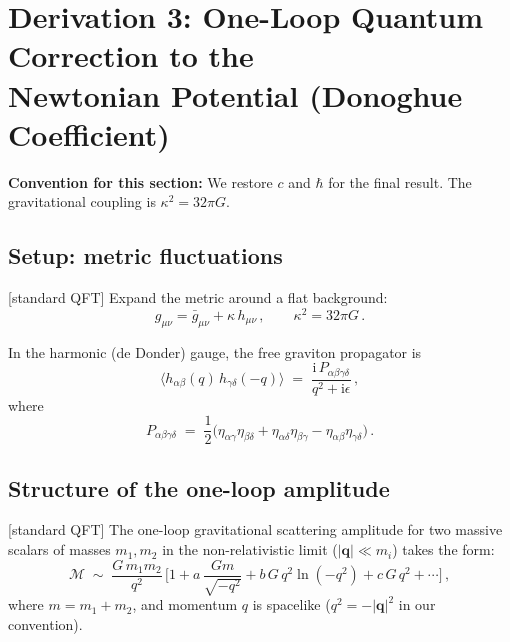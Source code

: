 \documentclass[12pt,a4paper]{article}
\theoremstyle{definition}
\theoremstyle{remark}
\newcommand{\ii}{\mathrm{i}}
\newcommand{\stdqft}{\textcolor{teal!80!black}{\textsf{[standard QFT]}}}
\begin{document}
\newpage
\section{Derivation 3: One-Loop Quantum Correction to the\\
         Newtonian Potential (Donoghue Coefficient)}
\label{sec:donoghue}

\noindent\textbf{Convention for this section:} We restore $c$ and
$\hbar$ for the final result.  The gravitational coupling is
$\kappa^2=32\pi G$.

\subsection{Setup: metric fluctuations}

\stdqft\;
Expand the metric around a flat background:
\begin{equation}
  g_{\mu\nu} = \bar{g}_{\mu\nu} + \kappa\, h_{\mu\nu}\,,
  \qquad
  \kappa^2 = 32\pi G\,.
  \label{eq:metric-fluct}
\end{equation}

In the harmonic (de Donder) gauge, the free graviton propagator is
\begin{equation}
  \langle h_{\alpha\beta}(q)\, h_{\gamma\delta}(-q)\rangle
  \;=\;
  \frac{\ii\, P_{\alpha\beta\gamma\delta}}{q^2 + \ii\epsilon}\,,
  \label{eq:graviton-prop}
\end{equation}
where
\begin{equation}
  P_{\alpha\beta\gamma\delta}
  \;=\;
  \frac{1}{2}\bigl(
    \eta_{\alpha\gamma}\eta_{\beta\delta}
    + \eta_{\alpha\delta}\eta_{\beta\gamma}
    - \eta_{\alpha\beta}\eta_{\gamma\delta}
  \bigr)\,.
  \label{eq:P-tensor}
\end{equation}


\subsection{Structure of the one-loop amplitude}

\stdqft\;
The one-loop gravitational scattering amplitude for two massive
scalars of masses $m_1, m_2$ in the non-relativistic limit
($|\mathbf{q}|\ll m_i$) takes the form:
\begin{equation}
  \mathcal{M}
  \;\sim\;
  \frac{G\,m_1 m_2}{q^2}\,
  \biggl[
    1
    + a\,\frac{Gm}{\sqrt{-q^2}}
    + b\,G\,q^2\ln(-q^2)
    + c\,G\,q^2
    + \cdots
  \biggr]\,,
  \label{eq:amplitude-structure}
\end{equation}
where $m = m_1 + m_2$, and momentum $q$ is spacelike
($q^2 = -|\mathbf{q}|^2$ in our convention).
\end{document}

